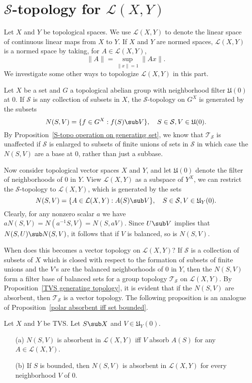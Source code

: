 \section{$\mathcal{S}$-topology for $\mathcal{L}(X,Y)$}
Let $X$ and $Y$ be topological spaces. We use $\mathcal{L}(X,Y)$ to denote the linear space of continuous linear maps from $X$ to $Y$. If $X$ and $Y$ are normed spaces, $\mathcal{L}(X,Y)$ is a normed space by taking, for $A\in\mathcal{L}(X,Y)$,
\[\|A\|=\sup_{\|x\|=1}\|Ax\|.\]
We investigate some other ways to topologize $\mathcal{L}(X,Y)$ in this part.\par
Let $X$ be a set and $G$ a topological abelian group with neighborhood filter $\mathfrak{U}(0)$ at $0$. If $\mathcal{S}$ is any collection of subsets in $X$, the $\mathcal{S}$-topology on $G^X$ is generated by the subsets
\[N(S,V)=\{f\in G^X:f(S)\sub V\},\quad S\in\mathcal{S},V\in\mathfrak{U}(0).\]
By Proposition~\ref{S-topo operation on generating set}, we know that $\mathcal{T}_\mathcal{S}$ is unaffected if $\mathcal{S}$ is enlarged to subsets of finite unions of sets in $\mathcal{S}$ in which case the $N(S,V)$ are a base at $0$, rather than just a subbase.\par
Now consider topological vector spaces $X$ and $Y$, and let $\mathfrak{U}(0)$ denote the filter of neighborhoods of $0$ in $Y$. View $\mathcal{L}(X,Y)$ as a subspace of $Y^X$, we can restrict the $\mathcal{S}$-topology to $\mathcal{L}(X,Y)$, which is generated by the sets
\[N(S,V)=\{A\in\mathcal{L}(X,Y):A(S)\sub V\},\quad S\in\mathcal{S},V\in\mathfrak{U}_Y(0).\]
Clearly, for any nonzero scalar $a$ we have $aN(S,V)=N(a^{-1}S,V)=N(S,aV)$. Since $U\sub V$ implies that $N(S,U)\sub N(S,V)$, it follows that if $V$ is balanced, so is $N(S,V)$.\par
When does this becomes a vector topology on $\mathcal{L}(X,Y)$? If $\mathcal{S}$ is a collection of subsets of $X$ which is closed with respect to the formation of subsets of finite unions and the $V$'s are the balanced neighborhoods of $0$ in $Y$, then the $N(S,V)$ form a filter base of balanced sets for a group topology $\mathcal{T}_\mathcal{S}$ on $\mathcal{L}(X,Y)$. By Proposition~\ref{TVS generating topology}, it is evident that if the $N(S,V)$ are absorbent, then $\mathcal{T}_\mathcal{S}$ is a vector topology. The following proposition is an analogue of Proposition~\ref{polar absorbent iff set bounded}.
\begin{proposition}\label{S-topo on L(X,Y) absorbent nbhd iff}
Let $X$ and $Y$ be TVS. Let $S\sub X$ and $V\in\mathfrak{U}_Y(0)$.
\begin{itemize}
\item[(a)] $N(S,V)$ is absorbent in $\mathcal{L}(X,Y)$ iff $V$ absorb $A(S)$ for any $A\in\mathcal{L}(X,Y)$.
\item[(b)] If $S$ is bounded, then $N(S,V)$ is absorbent in $\mathcal{L}(X,Y)$ for every neighborhood $V$ of $0$.
\end{itemize}
\end{proposition}
